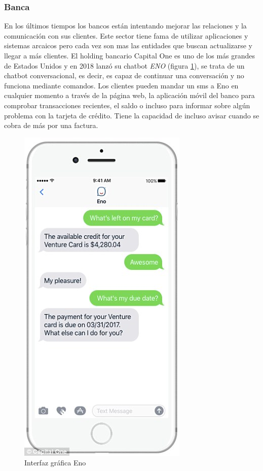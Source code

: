 \subsubsection{Banca}
En los últimos tiempos los bancos están intentando mejorar las relaciones y la comunicación con sus clientes. Este sector tiene fama de utilizar aplicaciones y sistemas arcaicos pero cada vez son mas las entidades que buscan actualizarse y llegar a más clientes. 
El holding bancario Capital One \cite{eno} es uno de los más grandes de Estados Unidos y en 2018 lanzó su chatbot \textit{ENO} (figura \ref{fig:eno}), se trata de un chatbot conversacional, es decir, es capaz de continuar una conversación y no funciona mediante comandos. Los clientes pueden mandar un sms a Eno en cualquier momento a través de la página web, la aplicación móvil del banco para comprobar transacciones recientes, el saldo o incluso para informar sobre algún problema con la tarjeta de crédito. Tiene la capacidad de incluso avisar cuando se cobra de más por una factura.

\begin{figure}[H]
    \centering
    \includegraphics[scale=0.3]{include/figuras/Eno.jpg}
    \caption{Interfaz gráfica Eno}
    \label{fig:eno}
\end{figure}


